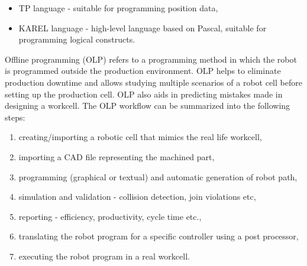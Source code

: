 \begin{itemize}

 \item TP language - suitable for programming position data,
 \item KAREL language - high-level language based on Pascal, suitable for programming logical constructs.

\end{itemize}

Offline programming  (OLP) refers to a programming method in which the robot is programmed outside the production environment. OLP helps to eliminate production downtime and allows studying multiple scenarios of a robot cell before setting up the production cell. OLP also aids in predicting mistakes made in designing a workcell. The OLP workflow can be summarized into the following steps:

\begin{enumerate}
  \item creating/importing a robotic cell that mimics the real life workcell,
  \item importing a CAD file representing the machined part,
  \item programming (graphical or textual) and automatic generation of robot path,
  \item simulation and validation - collision detection, join violations etc,
  \item reporting - efficiency, productivity, cycle time etc.,
  \item translating the robot program for a specific controller using a post processor,
  \item executing the robot program in a real workcell.
\end{enumerate}
